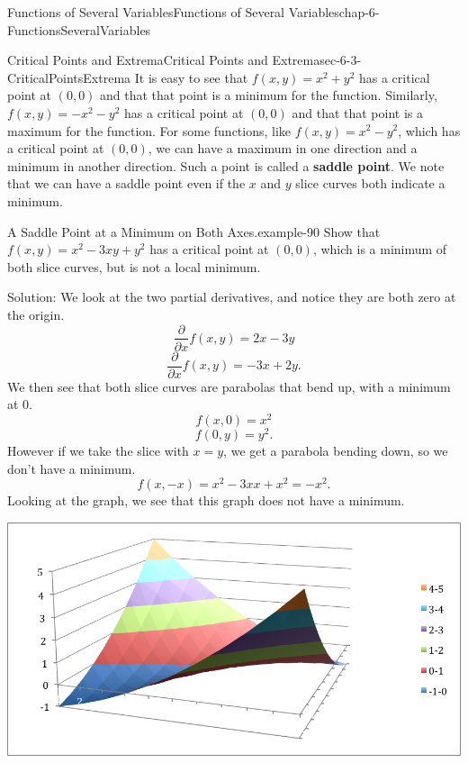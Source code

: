 \documentclass[oneside,10pt,]{book}
\newcommand{\terminology}[1]{\textbf{#1}}
\numberwithin{equation}{section}
\begin{document}
\begin{chapterptx}{Functions of Several Variables}{}{Functions of Several Variables}{}{}{chap-6-FunctionsSeveralVariables}
\begin{sectionptx}{Critical Points and Extrema}{}{Critical Points and Extrema}{}{}{sec-6-3-CriticalPointsExtrema}
\hypertarget{p-2343}{}%
It is easy to see that \(f(x,y)=x^2+y^2\) has a critical point at \((0,0)\) and that that point is a minimum for the function.  Similarly, \(f(x,y)=-x^2-y^2\) has a critical point at \((0,0)\) and that that point is a maximum for the function. For some functions, like \(f(x,y)=x^2-y^2\), which has a critical point at \((0,0)\), we can have a maximum in one direction and a minimum in another direction.  Such a point is called a \terminology{saddle point}.  We note that we can have a saddle point even if the \(x\) and \(y\) slice curves both indicate a minimum.%
\begin{example}{A Saddle Point at a Minimum on Both Axes.}{example-90}%
\hypertarget{p-2344}{}%
Show that \(f(x,y)=x^2-3xy+y^2\) has a critical point at \((0,0)\), which is a minimum of both slice curves, but is not a local minimum.%
\par
\hypertarget{p-2345}{}%
Solution:  We look at the two partial derivatives, and notice they are both zero at the origin.%
%
\begin{equation*}
\frac{\partial }{\partial x} f(x,y)=2x-3y
\end{equation*}
%
\begin{equation*}
\frac{\partial }{\partial x} f(x,y)=-3x+2y.
\end{equation*}
\hypertarget{p-2346}{}%
We then see that both slice curves are parabolas that bend up, with a minimum at 0.%
%
\begin{equation*}
f(x,0)=x^2
\end{equation*}
%
\begin{equation*}
f(0,y)=y^2.
\end{equation*}
\hypertarget{p-2347}{}%
However if we take the slice with \(x=y\), we get a parabola bending down, so we don’t have a minimum.%
%
\begin{equation*}
f(x,-x)=x^2-3x x+x^2=-x^2.
\end{equation*}
\hypertarget{p-2348}{}%
Looking at the graph, we see that this graph does not have a minimum.%
\begin{sidebyside}{1}{0}{0}{0}%
\begin{sbspanel}{1}%
\includegraphics[width=1\linewidth]{images/sec-6-3-6.png}

\end{sbspanel}
\end{sidebyside}
\end{example}
\end{sectionptx}
\end{chapterptx}
\end{document}
